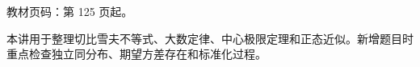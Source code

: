 
\begin{knowledgeBox}
教材页码：第 125 页起。

本讲用于整理切比雪夫不等式、大数定律、中心极限定理和正态近似。新增题目时重点检查独立同分布、期望方差存在和标准化过程。
\end{knowledgeBox}
